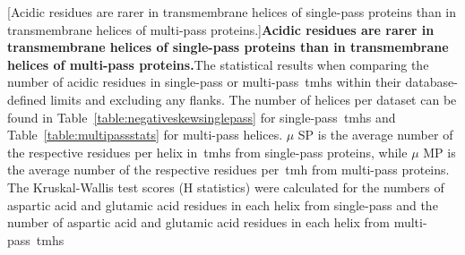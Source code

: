 \begin{table}[htbp]

  \centering
  [Acidic residues are rarer in transmembrane helices of single\--pass proteins than in transmembrane helices of multi\--pass proteins.]{\textbf{Acidic residues are rarer in transmembrane helices of single\--pass proteins than in transmembrane helices of multi\--pass proteins.}The statistical results when comparing the number of acidic residues in single\--pass or multi\--pass~\gls{tmh}s within their database-defined limits and excluding any flanks.
  The number of helices per dataset can be found in Table~\ref{table:negativeskewsinglepass} for single\--pass~\gls{tmh}s and Table~\ref{table:multipassstats} for multi\--pass helices.
  $\mu$ SP is the average number of the respective residues per helix in~\gls{tmh}s from single\--pass proteins, while $\mu$ MP is the average number of the respective residues per~\gls{tmh} from multi\--pass proteins.
  The Kruskal-Wallis test scores (H statistics) were calculated for the numbers of aspartic acid and glutamic acid residues in each helix from single\--pass and the number of aspartic acid and glutamic acid residues in each helix from multi\--pass~\gls{tmh}s}


\end{table}
